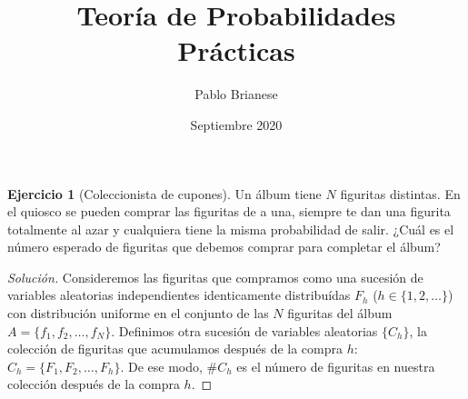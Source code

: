 \documentclass{article}
\title{Teoría de Probabilidades\\Prácticas}
\author{Pablo Brianese}
\date{Septiembre 2020}
\theoremstyle{definition}
\newtheorem{exercise}{Ejercicio}
\begin{document}
\maketitle

\begin{exercise}[Coleccionista de cupones]
Un álbum tiene $N$ figuritas distintas.
En el quiosco se pueden comprar las figuritas de a una, siempre te dan una figurita totalmente al azar y cualquiera tiene la misma probabilidad de salir. 
¿Cuál es el número esperado de figuritas que debemos comprar para completar el álbum?
\end{exercise}
\begin{proof}[Solución]
Consideremos las figuritas que compramos como una sucesión de variables aleatorias independientes identicamente distribuídas $F_h$ ($h \in \{1, 2, \dots\}$) con distribución uniforme en el conjunto de las $N$ figuritas del álbum $A = \{f_1, f_2, \dots, f_N\}$.
Definimos otra sucesión de variables aleatorias $\{C_h\}$, la colección de figuritas que acumulamos después de la compra $h$: $C_h = \{F_1, F_2, \dots, F_h\}$.
De ese modo, $\#C_h$ es el número de figuritas en nuestra colección después de la compra $h$.


\end{proof}
\end{document}
